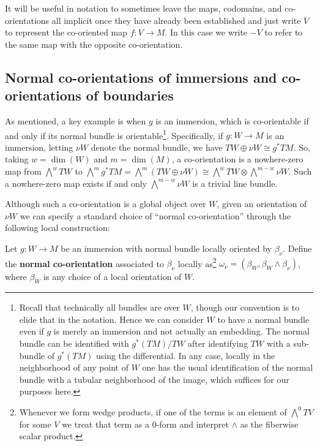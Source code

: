 \begin{notation}\label{N: implicit notation}
	It will be useful in notation to sometimes leave the maps, codomains, and co-orientations all implicit once they have already been established and just write $V$ to represent the co-oriented map $f \colon V \to M$.
	In this case we write $-V$ to refer to the same map with the opposite co-orientation.
\end{notation}

\subsection{Normal co-orientations of immersions and co-orientations of boundaries}\label{S: normal orientatin}

As mentioned, a key example is when $g$ is an immersion, which is co-orientable if and only if its normal bundle is orientable\footnote{Recall that technically all bundles are over $W$, though our convention is to elide that in the notation.
Hence we can consider $W$ to have a normal bundle even if $g$ is merely an immersion and not actually an embedding.
The normal bundle can be identified with $g^*(TM)/TW$ after identifying $TW$ with a sub-bundle of $g^*(TM)$ using the differential.
In any case, locally in the neighborhood of any point of $W$ one has the usual identification of the normal bundle with a tubular neighborhood of the image, which suffices for our purposes here.}.
Specifically, if $g \colon W \to M$ is an immersion, letting $\nu W$ denote the normal bundle, we have $TW \oplus \nu W \cong g^*TM$.
So, taking $w = \dim(W)$ and $m = \dim(M)$, a co-orientation is a nowhere-zero map from $\bigwedge^w TW$ to $\bigwedge^m g^*TM = \bigwedge^m (TW \oplus \nu W) \cong \bigwedge^w TW \otimes \bigwedge^{m-w}\nu W$.
Such a nowhere-zero map exists if and only $\bigwedge^{m-w}\nu W$ is a trivial line bundle.

Although such a co-orientation is a global object over $W$, given an orientation of $\nu W$ we can specify a standard choice of ``normal co-orientation'' through the following local construction:

\begin{definition}\label{normal co-or}
	Let $g \colon W \to M$ be an immersion with normal bundle locally oriented by $\beta_\nu$.
	Define the \textbf{normal co-orientation} associated to $\beta_\nu$ locally as\footnote{Whenever we form wedge products, if one of the terms is an element of $\bigwedge^0 TV$ for some $V$ we treat that term as a $0$-form and interpret $\wedge$ as the fiberwise scalar product.}
	$\omega_{\nu} = (\beta_W, \beta_W \wedge \beta_\nu)$, where $\beta_W$ is any choice of a local orientation of $W$.
\end{definition}

